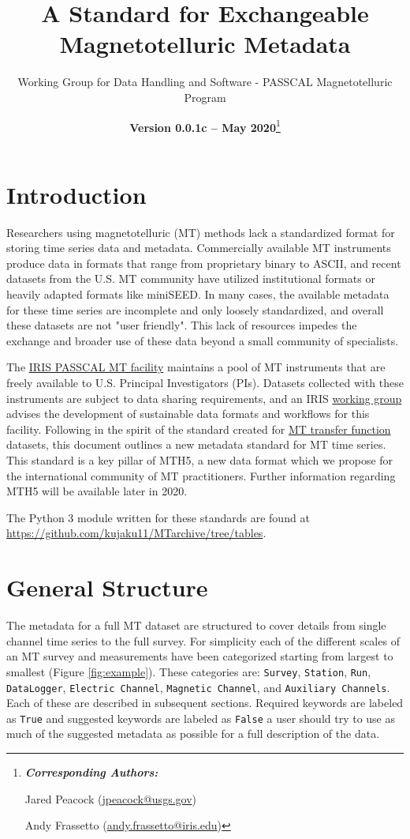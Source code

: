 \documentclass{article}
\title{A Standard for Exchangeable Magnetotelluric Metadata}
\date{\textbf{Version 0.0.1c -- May 2020}\footnote{\noindent\textbf{\textit{Corresponding Authors:}}
		
		Jared Peacock (\url{jpeacock@usgs.gov})
		
		Andy Frassetto (\url{andy.frassetto@iris.edu})}}
\author[1]{Working Group for Data Handling and Software - PASSCAL Magnetotelluric Program}
\affil[1]{Portable Array Seismic Studies of the Continental Lithosphere, Incorporated Research Institutions for Seismology}
\begin{document}
	
\maketitle

\tableofcontents
\vspace{1cm}

\newpage

\section{Introduction}

Researchers using magnetotelluric (MT) methods lack a standardized format for storing time series data and metadata. Commercially available MT instruments produce data in formats that range from proprietary binary to ASCII, and recent datasets from the U.S. MT community have utilized institutional formats or heavily adapted formats like miniSEED. In many cases, the available metadata for these time series are incomplete and only loosely standardized, and overall these datasets are not "user friendly". This lack of resources impedes the exchange and broader use of these data beyond a small community of specialists.

The \href{https://www.iris.edu/hq/programs/passcal/magnetotelluricnstrumentation}{IRIS PASSCAL MT facility} maintains a pool of MT instruments that are freely available to U.S. Principal Investigators (PIs). Datasets collected with these instruments are subject to data sharing requirements, and an IRIS \href{https://www.iris.edu/hq/aboutris/governance/mtoft}{working group} advises the development of sustainable data formats and workflows for this facility. Following in the spirit of the standard created for \href{https://library.seg.org/doi/10.1190/geo2018-0679.1}{MT transfer function} datasets, this document outlines a new metadata standard for MT time series. This standard is a key pillar of MTH5, a new data format which we propose for the international community of MT practitioners. Further information regarding MTH5 will be available later in 2020.

The Python 3 module written for these standards are found at \url{https://github.com/kujaku11/MTarchive/tree/tables}.

\section{General Structure}

The metadata for a full MT dataset are structured to cover details from single channel time series to the full survey. For simplicity each of the different scales of an MT survey and measurements have been categorized starting from largest to smallest (Figure \ref{fig:example}). These categories are: \verb|Survey|, \verb|Station|, \verb|Run|, \verb|DataLogger|, \verb|Electric Channel|, \verb|Magnetic Channel|, and \verb|Auxiliary Channels|. Each of these are described in subsequent sections.  Required keywords are labeled as \verb|True| and suggested keywords are labeled as \verb|False| a user should try to use as much of the suggested metadata as possible for a full description of the data.  
\end{document}
